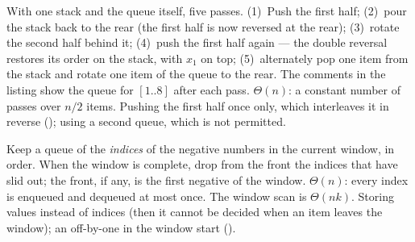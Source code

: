 \idea With one stack and the queue itself, five passes. (1)~Push the first half;
(2)~pour the stack back to the rear (the first half is now reversed at the rear);
(3)~rotate the second half behind it; (4)~push the first half again --- the double
reversal restores its order on the stack, with $x_1$ on top; (5)~alternately pop one item
from the stack and rotate one item of the queue to the rear. The comments in the listing
show the queue for $[1..8]$ after each pass.
\complexity $\Theta(n)$: a constant number of passes over $n/2$ items.
\mistakes Pushing the first half once only, which interleaves it in reverse
(); using a second queue, which is not permitted.

\idea Keep a queue of the \emph{indices} of the negative numbers in the current window, in
order. When the window  is complete, drop from the front the indices that
have slid out; the front, if any, is the first negative of the window.
\complexity $\Theta(n)$: every index is enqueued and dequeued at most once. The window
scan is $\Theta(nk)$.
\mistakes Storing values instead of indices (then it cannot be decided when an item
leaves the window); an off-by-one in the window start ().
